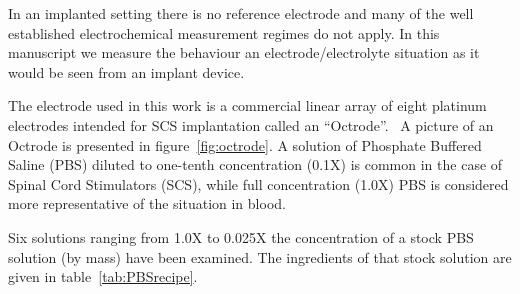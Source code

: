 \documentclass[journal, a4paper]{IEEEtran}
\begin{document}
In an implanted setting there is no reference electrode and many of the well established electrochemical measurement regimes do not apply. In this manuscript we measure the behaviour an electrode/electrolyte situation as it would be seen from an implant device.

The electrode used in this work is a commercial linear array of eight platinum electrodes intended for SCS implantation called an ``Octrode''.~\cite{StJudeOctrode} A picture of an Octrode is presented in figure~\ref{fig:octrode}. A solution of Phosphate Buffered Saline (PBS) diluted to one-tenth concentration (0.1X) is common in the case of Spinal Cord Stimulators (SCS), while full concentration (1.0X) PBS is considered more representative of the situation in blood.



Six solutions ranging from 1.0X to 0.025X the concentration of a stock PBS solution (by mass) have been examined.
The ingredients of that stock solution are given in table~\ref{tab:PBSrecipe}.
\end{document}
